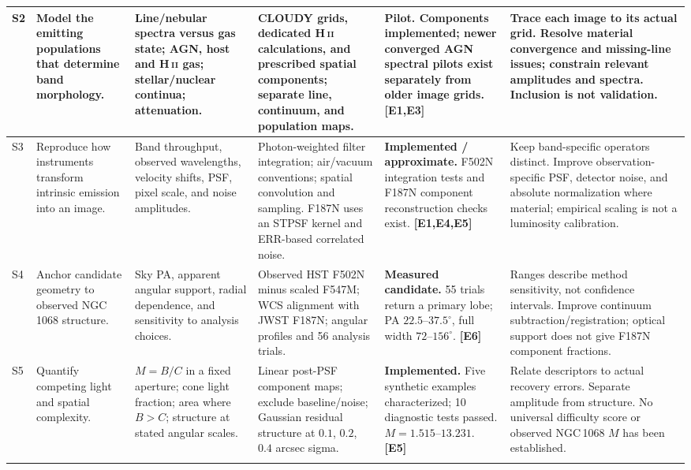 \documentclass[10pt,letterpaper]{article}
\newcommand{\ev}[1]{\textcolor{ink}{\textbf{[#1]}}}
\newcommand{\status}[1]{\textbf{#1.}}
\newcommand{\hii}{H\,\textsc{ii}}
\begin{document}
\begin{landscape}
\begin{longtable}{P{0.35in}P{1.35in}P{1.60in}P{1.82in}P{1.78in}P{2.10in}}
S2 & Model the emitting populations that determine band morphology. &
Line/nebular spectra versus gas state; AGN, host and \hii{} gas; stellar/nuclear continua; attenuation. &
CLOUDY grids, dedicated \hii{} calculations, and prescribed spatial components; separate line, continuum, and population maps. &
\status{Pilot} Components implemented; newer converged AGN spectral pilots exist separately from older image grids. \ev{E1,E3} &
Trace each image to its actual grid. Resolve material convergence and missing-line issues; constrain relevant amplitudes and spectra. Inclusion is not validation. \\[5pt]
\midrule

S3 & Reproduce how instruments transform intrinsic emission into an image. &
Band throughput, observed wavelengths, velocity shifts, PSF, pixel scale, and noise amplitudes. &
Photon-weighted filter integration; air/vacuum conventions; spatial convolution and sampling. F187N uses an STPSF kernel and ERR-based correlated noise. &
\status{Implemented / approximate} F502N integration tests and F187N component reconstruction checks exist. \ev{E1,E4,E5} &
Keep band-specific operators distinct. Improve observation-specific PSF, detector noise, and absolute normalization where material; empirical scaling is not a luminosity calibration. \\[5pt]
\midrule

S4 & Anchor candidate geometry to observed NGC\,1068 structure. &
Sky PA, apparent angular support, radial dependence, and sensitivity to analysis choices. &
Observed HST F502N minus scaled F547M; WCS alignment with JWST F187N; angular profiles and 56 analysis trials. &
\status{Measured candidate} 55 trials return a primary lobe; PA $22.5$--$37.5^\circ$, full width $72$--$156^\circ$. \ev{E6} &
Ranges describe method sensitivity, not confidence intervals. Improve continuum subtraction/registration; optical support does not give F187N component fractions. \\[5pt]
\midrule

S5 & Quantify competing light and spatial complexity. &
$M=B/C$ in a fixed aperture; cone light fraction; area where $B>C$; structure at stated angular scales. &
Linear post-PSF component maps; exclude baseline/noise; Gaussian residual structure at $0.1$, $0.2$, $0.4$ arcsec sigma. &
\status{Implemented} Five synthetic examples characterized; 10 diagnostic tests passed. $M=1.515$--$13.231$. \ev{E5} &
Relate descriptors to actual recovery errors. Separate amplitude from structure. No universal difficulty score or observed NGC\,1068 $M$ has been established. \\
\newpage


\end{longtable}
\end{landscape}
\end{document}
